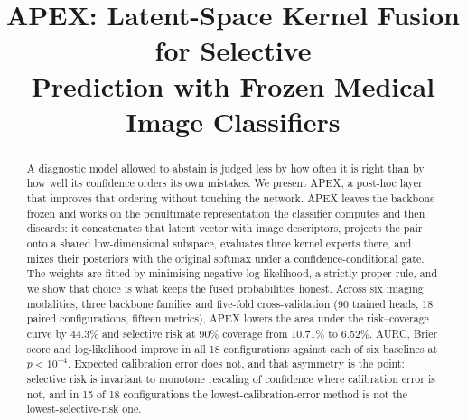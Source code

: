\documentclass[conference]{IEEEtran}
\begin{document}
\title{APEX: Latent-Space Kernel Fusion for Selective\\ Prediction with Frozen Medical Image Classifiers}

\author{
\and
{}
}

\maketitle

\begin{abstract}
A diagnostic model allowed to abstain is judged less by how often it is right than
by how well its confidence orders its own mistakes. We present APEX, a post-hoc
layer that improves that ordering without touching the network. APEX leaves the
backbone frozen and works on the penultimate representation the classifier
computes and then discards: it concatenates that latent vector with image
descriptors, projects the pair onto a shared low-dimensional subspace, evaluates
three kernel experts there, and mixes their posteriors with the original softmax
under a confidence-conditional gate. The weights are fitted by minimising negative
log-likelihood, a strictly proper rule, and we show that choice is what keeps the
fused probabilities honest. Across six imaging modalities, three backbone families
and five-fold cross-validation (90 trained heads, 18 paired configurations,
fifteen metrics), APEX lowers the area under the risk--coverage curve by 44.3\%
and selective risk at 90\% coverage from 10.71\% to 6.52\%. AURC, Brier score and
log-likelihood improve in all 18 configurations against each of six baselines at
$p<10^{-4}$. Expected calibration error does not, and that asymmetry is the point:
selective risk is invariant to monotone rescaling of confidence where calibration
error is not, and in 15 of 18 configurations the lowest-calibration-error method is
not the lowest-selective-risk one.
\end{abstract}
\end{document}
